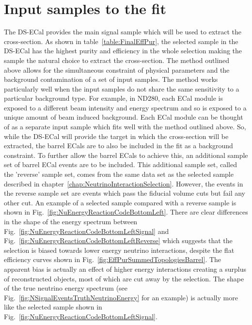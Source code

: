 \section{Input samples to the fit}
\label{sec:InputSamples}
The DS-ECal provides the main signal sample which will be used to extract the cross-section.  As shown in table~\ref{table:FinalEffPur}, the selected sample in the DS-ECal has the highest purity and efficiency in the whole selection making the sample the natural choice to extract the cross-section.
\newline
\newline
The method outlined above allows for the simultaneous constraint of physical parameters and the background contamination of a set of input samples.  The method works particularly well when the input samples do not share the same sensitivity to a particular background type.  For example, in ND280, each ECal module is exposed to a different beam intensity and energy spectrum and so is exposed to a unique amount of beam induced background.  Each ECal module can be thought of as a separate input sample which fits well with the method outlined above.  So, while the DS-ECal will provide the target in which the cross-section will be extracted, the barrel ECals are to also be included in the fit as a background constraint.  To further allow the barrel ECals to achieve this, an additional sample set of barrel ECal events are to be included.  This additional sample set, called the 'reverse' sample set,  comes from the same data set as the selected sample described in chapter~\ref{chap:NeutrinoInteractionSelection}.  However, the events in the reverse sample set are events which pass the fiducial volume cuts but fail any other cut.  An example of a selected sample compared with a reverse sample is shown in Fig.~\ref{fig:NuEnergyReactionCodeBottomLeft}.  There are clear differences in the shape of the energy spectrum between Fig.~\ref{fig:NuEnergyReactionCodeBottomLeftSignal} and Fig.~\ref{fig:NuEnergyReactionCodeBottomLeftReverse} which suggests that the selection is biased towards lower energy neutrino interactions, despite the flat efficiency curves shown in Fig.~\ref{fig:EffPurSummedTopologiesBarrel}. The apparent bias is actually an effect of higher energy interactions creating a surplus of reconstructed objects, most of which are cut away by the selection.  The shape of the true neutrino energy spectrum (see Fig.~\ref{fig:NSignalEventsTruthNeutrinoEnergy} for an example) is actually more like the selected sample shown in Fig.~\ref{fig:NuEnergyReactionCodeBottomLeftSignal}.
